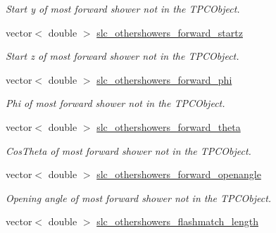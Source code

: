 \begin{DoxyCompactItemize}
\begin{DoxyCompactList}\small\item\em Start y of most forward shower not in the T\-P\-C\-Object. \end{DoxyCompactList}\item 
\hypertarget{classUBXSecEvent_aaf0aff9ad8744f108a8f65e622aa9892}{vector$<$ double $>$ \hyperlink{classUBXSecEvent_aaf0aff9ad8744f108a8f65e622aa9892}{slc\-\_\-othershowers\-\_\-forward\-\_\-startz}}\label{classUBXSecEvent_aaf0aff9ad8744f108a8f65e622aa9892}

\begin{DoxyCompactList}\small\item\em Start z of most forward shower not in the T\-P\-C\-Object. \end{DoxyCompactList}\item 
\hypertarget{classUBXSecEvent_adf057c48d3af2b21664662c2921ea32a}{vector$<$ double $>$ \hyperlink{classUBXSecEvent_adf057c48d3af2b21664662c2921ea32a}{slc\-\_\-othershowers\-\_\-forward\-\_\-phi}}\label{classUBXSecEvent_adf057c48d3af2b21664662c2921ea32a}

\begin{DoxyCompactList}\small\item\em Phi of most forward shower not in the T\-P\-C\-Object. \end{DoxyCompactList}\item 
\hypertarget{classUBXSecEvent_a6aee218613c7b148852b5ccca813b42b}{vector$<$ double $>$ \hyperlink{classUBXSecEvent_a6aee218613c7b148852b5ccca813b42b}{slc\-\_\-othershowers\-\_\-forward\-\_\-theta}}\label{classUBXSecEvent_a6aee218613c7b148852b5ccca813b42b}

\begin{DoxyCompactList}\small\item\em Cos\-Theta of most forward shower not in the T\-P\-C\-Object. \end{DoxyCompactList}\item 
\hypertarget{classUBXSecEvent_aa32fe9b6345e01ef27de5bdd173ee1e2}{vector$<$ double $>$ \hyperlink{classUBXSecEvent_aa32fe9b6345e01ef27de5bdd173ee1e2}{slc\-\_\-othershowers\-\_\-forward\-\_\-openangle}}\label{classUBXSecEvent_aa32fe9b6345e01ef27de5bdd173ee1e2}

\begin{DoxyCompactList}\small\item\em Opening angle of most forward shower not in the T\-P\-C\-Object. \end{DoxyCompactList}\item 
\hypertarget{classUBXSecEvent_a933fe9543d4376ae6c6dde9177724648}{vector$<$ double $>$ \hyperlink{classUBXSecEvent_a933fe9543d4376ae6c6dde9177724648}{slc\-\_\-othershowers\-\_\-flashmatch\-\_\-length}}\label{classUBXSecEvent_a933fe9543d4376ae6c6dde9177724648}


\end{DoxyCompactItemize}
